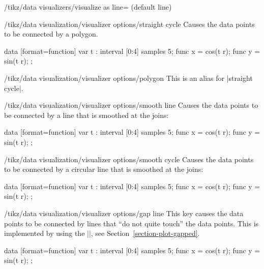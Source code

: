 \begin{key}{/tikz/data visualizers/visualize as line= (default line)}
  \begin{key}{/tikz/data visualization/visualizer options/straight cycle}
    Causes the data points to be connected by a polygon.
\begin{codeexample}[]
\tikz [scale=.55] \datavisualization
 [scientific clean axes, all axes={ticks=few},
  visualize as smooth line=my data,  my data={straight cycle}]
data [format=function] {
  var t : interval [0:4] samples 5;
  func x = cos(\value t r);
  func y = sin(\value t r);
};
\end{codeexample}
 \end{key}
 
 \begin{key}{/tikz/data visualization/visualizer options/polygon}
   This is an alias for |straight cycle|.
 \end{key}
 
 \begin{key}{/tikz/data visualization/visualizer options/smooth line}
   Causes the data points to be connected by a line that is smoothed
   at the joins:
\begin{codeexample}[]
\tikz [scale=.55] \datavisualization
 [scientific clean axes, all axes={ticks=few},
  visualize as smooth line=my data,  my data={smooth line}]
data [format=function] {
  var t : interval [0:4] samples 5;
  func x = cos(\value t r);
  func y = sin(\value t r);
};
\end{codeexample}
 \end{key}
 
 \begin{key}{/tikz/data visualization/visualizer options/smooth cycle}
   Causes the data points to be connected by a circular line that is
   smoothed at the joins:
\begin{codeexample}[]
\tikz [scale=.55] \datavisualization
 [scientific clean axes, all axes={ticks=few},
  visualize as smooth line=my data,  my data={smooth cycle}]
data [format=function] {
  var t : interval [0:4] samples 5;
  func x = cos(\value t r);
  func y = sin(\value t r);
};
\end{codeexample}
 \end{key}
 
 \begin{key}{/tikz/data visualization/visualizer options/gap line}
   This key causes the data points to be connected by lines that ``do
   not quite touch'' the data points. This is implemented by using the
   |\pgfplothandlergaplineto|, see Section~\ref{section-plot-gapped}. 
\begin{codeexample}[]
\tikz [scale=.55] \datavisualization
 [scientific clean axes, all axes={ticks=few},
  visualize as smooth line=my data,  my data={gap line}]
data [format=function] {
  var t : interval [0:4] samples 5;
  func x = cos(\value t r);
  func y = sin(\value t r);
};
\end{codeexample}
 \end{key}
 

\end{key}
